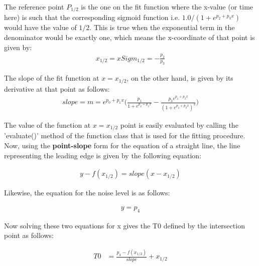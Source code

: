 \documentclass[12pt,epsfig]{article}
\begin{document}
The reference point $P_{1/2}$ is the one on the fit function where the x-value (or time here) is such that the corresponding
sigmoid function i.e. $1.0/(1+e^{p_2 + p_3 x})$ would have the value of $1/2$. This is true when the exponential term in
the denominator would be exactly one, which means the x-coordinate of that point is given by:
\begin{equation}
\label{xSigHalf}
\begin{aligned}
     x_{1/2} = xSigm_{1/2} = - \frac{p_2}{p_3}
\end{aligned}
\end{equation}

The slope of the fit function at $x = x_{1/2}$, on the other hand, is given by its derivative at that point as
follows:
\begin{equation}
\label{slopeSigHalf}
\begin{aligned}
  slope = m  =  e^{p_0 + p_1 x} \Big( \frac{p_1}{1 + e^{p_2 + p_3 x}} -   \frac{p_3 e^{p_2 + p_3 x}}{(1 + e^{p_2 + p_3 x})^2}    \Big)
\end{aligned}
\end{equation}

The value of the function at $x = x_{1/2}$ point is easily evaluated by calling the 'evaluate()' method of the
function class that is used for the fitting procedure. Now, using the \textbf{point-slope} form for the equation of
a straight line, the line representing the leading edge is given by the following equation:

\begin{equation}
\label{eqLeadingEdge}
\begin{aligned}
  y - f(x_{1/2}) = slope (x - x_{1/2})
\end{aligned}
\end{equation}

Likewise, the equation for the noise level is as follows:

\begin{equation}
\label{eqNoiseLevel}
\begin{aligned}
  y = p_4
\end{aligned}
\end{equation}

Now solving these two equations for x gives the T0 defined by the intersection point as follows:

\begin{equation}
\label{T0estm1}
\begin{aligned}
  T0   & =  \frac{p_4 - f(x_{1/2})}{slope} + x_{1/2} \\
\end{aligned}
\end{equation}
\end{document}
